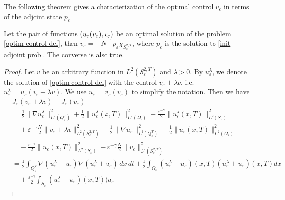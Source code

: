 \documentclass[reqno]{amsart}
\begin{document}
The following theorem gives a characterization of the optimal control 
$v_{\varepsilon }$ in terms of the adjoint state $p_{\varepsilon }$.

\begin{theorem}
\label{thm: init opt cont} 
Let the pair of functions $(u_\varepsilon(v_%
\varepsilon), v_\varepsilon)$ be an optimal solution of the problem 
\eqref{optim control def}, then $v_\varepsilon = -N^{-1}p_\varepsilon
\chi_{S^{2, T}_\varepsilon}$, 
where $p_\varepsilon$ is the solution to 
\eqref{init adjoint prob}. The converse is also true.
\end{theorem}

\begin{proof}
Let $v$ be an arbitrary function in $L^2(S^{2 ,T} _{\varepsilon })$ and 
$\lambda >0$. By $u_{\varepsilon }^{\lambda }$, we denote the solution of 
\eqref{optim control def} with the control $v_{\varepsilon }+\lambda v$,
i.e.\ $u_{\varepsilon }^{\lambda }=u_{\varepsilon }(v_{\varepsilon }+\lambda v)$. 
We use $u_{\varepsilon }=u_{\varepsilon }(v_{\varepsilon })$ to
simplify the notation. Then we have
\begin{align*}
&J_{\varepsilon }(v_{\varepsilon }+\lambda v)-J_{\varepsilon }(v_{\varepsilon })\\
&=\frac{1}{2}\| \nabla u_{\varepsilon }^{\lambda }\|
 _{L^2(Q_{\varepsilon }^{T})}^2+\frac{1}{2}\| u_{\varepsilon
 }^{\lambda }(x,T)\| _{L^2(\Omega _{\varepsilon })}^2 
 +\frac{\varepsilon ^{-\gamma }}{2}\| u_{\varepsilon }^{\lambda
 }(x,T)\| _{L^2(S_{\varepsilon })}^2 \\
&\quad +\varepsilon ^{-\gamma }\frac{N}{2}%
 \| v_{\varepsilon }+\lambda v\| _{L^2(S_{\varepsilon }^{2,T})}^2 
 -\frac{1}{2}\| \nabla u_{\varepsilon }\| _{L^2(Q_{\varepsilon }^{T})}^2
 -\frac{1}{2}\| u_{\varepsilon }(x,T)\| _{L^2(\Omega _{\varepsilon })}^2 \\
&\quad -\frac{\varepsilon ^{-\gamma }}{2}\| u_{\varepsilon }(x,T)\|
 _{L^2(S_{\varepsilon })}^2-\varepsilon ^{-\gamma }\frac{N}{2}\|
 v_{\varepsilon }\| _{L^2(S_{\varepsilon }^{2,T})}^2 \\
& =\frac{1}{2}\int _{Q_{\varepsilon }^{T}}\nabla (u_{\varepsilon
 }^{\lambda }-u_{\varepsilon })\nabla (u_{\varepsilon }^{\lambda
 }+u_{\varepsilon })\,dx\,dt+\frac{1}{2}\int _{\Omega _{\varepsilon
 }}(u_{\varepsilon }^{\lambda }-u_{\varepsilon })(x,T)(u_{\varepsilon
 }^{\lambda }+u_{\varepsilon })(x,T){dx} \\
&\quad +\frac{\varepsilon ^{-\gamma }}{2}\int _{S_{\varepsilon
 }}(u_{\varepsilon }^{\lambda }-u_{\varepsilon })(x,T)(u_{\varepsilon
}
\end{align*}
\end{proof}
\end{document}
